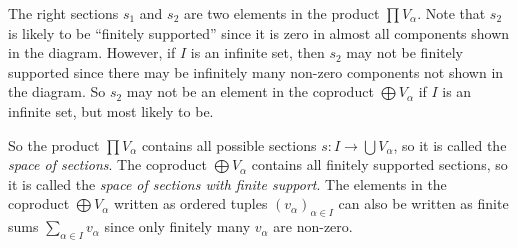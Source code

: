 \documentclass[
	11pt, %
	fleqn, %
	a4paper, %
]{LegrandOrangeBook}
\begin{document}
\begin{remark}
    The right sections $s_1$ and $s_2$ are two elements in the product $\prod V_\alpha$. Note that $s_2$ is likely to be ``finitely supported'' since it is zero in almost all components shown in the diagram. However, if $I$ is an infinite set, then $s_2$ may not be finitely supported since there may be infinitely many non-zero components not shown in the diagram. So $s_2$ may not be an element in the coproduct $\bigoplus V_\alpha$ if $I$ is an infinite set, but most likely to be.
\end{remark}

So the product $\prod V_\alpha$ contains all possible sections $s : I \to \bigcup V_\alpha$, so it is called the \emph{space of sections}. The coproduct $\bigoplus V_\alpha$ contains all finitely supported sections, so it is called the \emph{space of sections with finite support}. The elements in the coproduct $\bigoplus V_\alpha$ written as ordered tuples $(v_\alpha)_{\alpha \in I}$ can also be written as finite sums $\sum_{\alpha \in I} v_\alpha$ since only finitely many $v_\alpha$ are non-zero.
\end{document}

